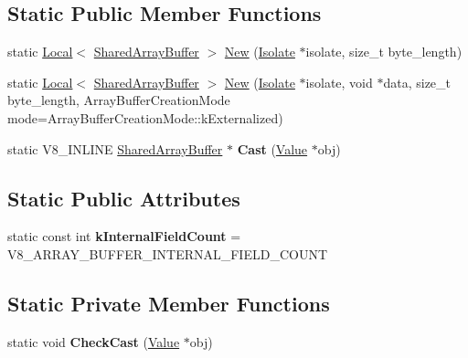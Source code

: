 \subsection*{Static Public Member Functions}
\begin{DoxyCompactItemize}
\item 
static \hyperlink{classv8_1_1_local}{Local}$<$ \hyperlink{classv8_1_1_shared_array_buffer}{Shared\+Array\+Buffer} $>$ \hyperlink{classv8_1_1_shared_array_buffer_a3162c3d636c0c184db7001086f68a79a}{New} (\hyperlink{classv8_1_1_isolate}{Isolate} $\ast$isolate, size\+\_\+t byte\+\_\+length)
\item 
static \hyperlink{classv8_1_1_local}{Local}$<$ \hyperlink{classv8_1_1_shared_array_buffer}{Shared\+Array\+Buffer} $>$ \hyperlink{classv8_1_1_shared_array_buffer_ada351f205ccc0cb9616df676beda7d17}{New} (\hyperlink{classv8_1_1_isolate}{Isolate} $\ast$isolate, void $\ast$data, size\+\_\+t byte\+\_\+length, Array\+Buffer\+Creation\+Mode mode=Array\+Buffer\+Creation\+Mode\+::k\+Externalized)
\item 
static V8\+\_\+\+I\+N\+L\+I\+NE \hyperlink{classv8_1_1_shared_array_buffer}{Shared\+Array\+Buffer} $\ast$ {\bfseries Cast} (\hyperlink{classv8_1_1_value}{Value} $\ast$obj)\hypertarget{classv8_1_1_shared_array_buffer_ac4e1ba5d4564c7033814f4cc45fdda84}{}\label{classv8_1_1_shared_array_buffer_ac4e1ba5d4564c7033814f4cc45fdda84}

\end{DoxyCompactItemize}
\subsection*{Static Public Attributes}
\begin{DoxyCompactItemize}
\item 
static const int {\bfseries k\+Internal\+Field\+Count} = V8\+\_\+\+A\+R\+R\+A\+Y\+\_\+\+B\+U\+F\+F\+E\+R\+\_\+\+I\+N\+T\+E\+R\+N\+A\+L\+\_\+\+F\+I\+E\+L\+D\+\_\+\+C\+O\+U\+NT\hypertarget{classv8_1_1_shared_array_buffer_a6f47f6b441e37aefd1a9d0176e8a3da8}{}\label{classv8_1_1_shared_array_buffer_a6f47f6b441e37aefd1a9d0176e8a3da8}

\end{DoxyCompactItemize}
\subsection*{Static Private Member Functions}
\begin{DoxyCompactItemize}
\item 
static void {\bfseries Check\+Cast} (\hyperlink{classv8_1_1_value}{Value} $\ast$obj)\hypertarget{classv8_1_1_shared_array_buffer_a9cb59d11c38b3caaf11fa74436d8b34f}{}\label{classv8_1_1_shared_array_buffer_a9cb59d11c38b3caaf11fa74436d8b34f}

\end{DoxyCompactItemize}



